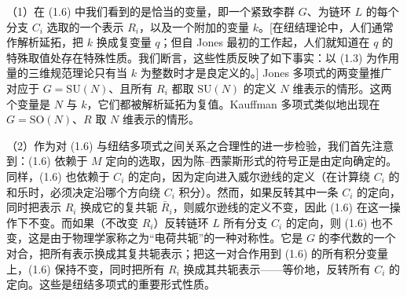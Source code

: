 \documentclass[11pt,a4paper]{article}
\begin{document}
（1）在 (1.6) 中我们看到的是恰当的变量，即一个紧致李群 $G$、为链环 $L$ 的每个分支 $C_i$ 选取的一个表示 $R_i$，以及一个附加的变量 $k$。[在纽结理论中，人们通常作解析延拓，把 $k$ 换成复变量 $q$；但自 Jones 最初的工作起，人们就知道在 $q$ 的特殊取值处存在特殊性质。我们断言，这些性质反映了如下事实：以 (1.3) 为作用量的三维规范理论只有当 $k$ 为整数时才是良定义的。] Jones 多项式的两变量推广对应于 $G=\mathrm{SU}(N)$、且所有 $R_i$ 都取 $\mathrm{SU}(N)$ 的定义 $N$ 维表示的情形。这两个变量是 $N$ 与 $k$，它们都被解析延拓为复值。Kauffman 多项式类似地出现在 $G=\mathrm{SO}(N)$、$R$ 取 $N$ 维表示的情形。


（2）作为对 (1.6) 与纽结多项式之间关系之合理性的进一步检验，我们首先注意到：(1.6) 依赖于 $M$ 定向的选取，因为陈–西蒙斯形式的符号正是由定向确定的。同样，(1.6) 也依赖于 $C_i$ 的定向，因为定向进入威尔逊线的定义（在计算绕 $C_i$ 的和乐时，必须决定沿哪个方向绕 $C_i$ 积分）。然而，如果反转其中一条 $C_i$ 的定向，同时把表示 $R_i$ 换成它的复共轭 $\bar{R}_i$，则威尔逊线的定义不变，因此 (1.6) 在这一操作下不变。而如果（不改变 $R_i$）反转链环 $L$ 所有分支 $C_i$ 的定向，则 (1.6) 也不变，这是由于物理学家称之为“电荷共轭”的一种对称性。它是 $G$ 的李代数的一个对合，把所有表示换成其复共轭表示；把这一对合作用到 (1.6) 的所有积分变量上，(1.6) 保持不变，同时把所有 $R_i$ 换成其共轭表示——等价地，反转所有 $C_i$ 的定向。这些是纽结多项式的重要形式性质。

\end{document}
